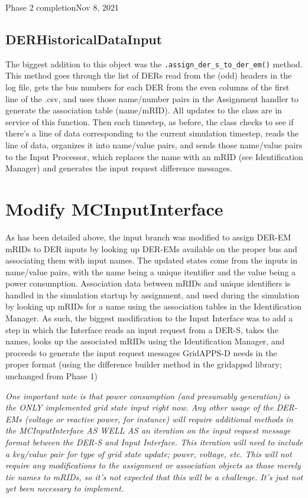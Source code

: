\begin{entry}{Phase 2 completion}{Nov 8, 2021}
    \subsection*{DERHistoricalDataInput}
    The biggest addition to this object was the \verb|.assign_der_s_to_der_em()| method. This
    method goes through the list of DERs read from the (odd) headers in the log file, gets the bus numbers for each
    DER from the even columns of the first line of the .csv, and uses those name/number pairs in the Assignment
    handler to generate the association table (name/mRID). All updates to the class are in service of this function.
    Then each timestep, as before, the class checks to see if there's a line of data corresponding to the current
    simulation timestep, reads the line of data, organizes it into name/value pairs, and sends those name/value pairs
    to the Input Processor, which replaces the name with an mRID (see Identification Manager) and generates the input
    request difference messages.

    \section*{Modify MCInputInterface}
    As has been detailed above, the input branch was modified to assign DER-EM mRIDs to DER inputs by looking up
    DER-EMs available on the proper bus and associating them with input names. The updated states come from the inputs
    in name/value pairs, with the name being a unique itentifier and the value being a power consumption. Association
    data between mRIDs and unique identifiers is handled in the simulation startup by assignment, and used during the
    simulation by looking up mRIDs for a name using the association tables in the Identification Manager. As such, the
    biggest modification to the Input Interface was to add a step in which the Interface reads an input request from a
    DER-S, takes the names, looks up the associated mRIDs using the Identification Manager, and proceeds to generate
    the input request messages GridAPPS-D needs in the proper format (using the difference builder method in the
    gridappsd library; unchanged from Phase 1)

    \textit{One important note is that power consumption (and presumably generation) is the ONLY implemented grid
    state input right now. Any other usage of the DER-EMs (voltage or reactive power, for instance) will require
    additional methods in the MCInputInterface AS WELL AS an iteration on the input request message format between
    the DER-S and Input Interface. This iteration will need to include a key/value pair for type of grid state
    update; power, voltage, etc. This will not require any modifications to the assignment or association objects as
    those merely tie names to mRIDs, so it's not expected that this will be a challenge. It's just not yet been
    necessary to implement.}


\end{entry}
